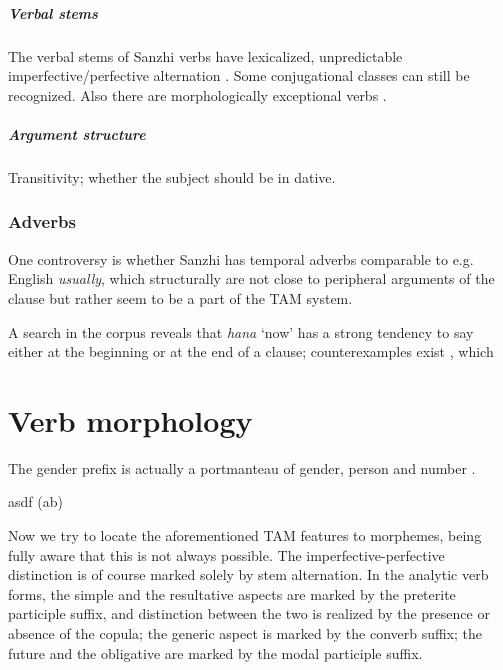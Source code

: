 \documentclass[a4paper, oneside, 12pt]{report}
\newcommand*{\citesec}[1]{\S~{#1}}
\newcommand*{\citetable}[1]{Table~{#1}}
\newcommand*{\citepage}[1]{p.~{#1}}
\newcommand{\form}[1]{\emph{#1}}
\newcommand{\translate}[1]{`#1'}
\newcommand{\source}[1]{\hspace{\fill}\mbox{}\linebreak[0]\hspace*{\fill}\mbox{(\small #1)}}
\begin{document}
\paragraph*{Verbal stems} The verbal stems of Sanzhi verbs have 
lexicalized, unpredictable imperfective/perfective alternation
\citep[\citesec{11.2}]{forker2020grammar}.
Some conjugational classes can still be recognized.
Also there are morphologically exceptional verbs 
\citep[\citesec{11.2.7}]{forker2020grammar}.

\paragraph*{Argument structure} Transitivity; whether the subject should be in dative.

\subsection{Adverbs}

One controversy is whether Sanzhi has temporal adverbs 
comparable to e.g. English \form{usually}, 
which structurally are not close to peripheral arguments of the clause 
but rather seem to be a part of the TAM system.

A search in the corpus reveals that 
\form{hana} \translate{now} has a strong tendency to say either 
at the beginning or at the end of a clause; 
counterexamples exist 
\citep[\citepage{292}, 37, 40]{forker2020grammar}, 
which 

\chapter{Verb morphology}

The gender prefix is actually a portmanteau of 
gender, person and number \citep[\citetable{20.1}]{forker2020grammar}.

\begin{exe}
    \ex asdf \source{ab}
\end{exe}

Now we try to locate the aforementioned TAM features to morphemes, 
being fully aware that this is not always possible. 
The imperfective-perfective distinction is of course marked 
solely by stem alternation.
In the analytic verb forms, 
the simple and the resultative aspects
are marked by the preterite participle suffix, 
and distinction between the two is realized by the 
presence or absence of the copula; 
the generic aspect is marked by the converb suffix; 
the future and the obligative are marked by 
the modal participle suffix.
\end{document}
